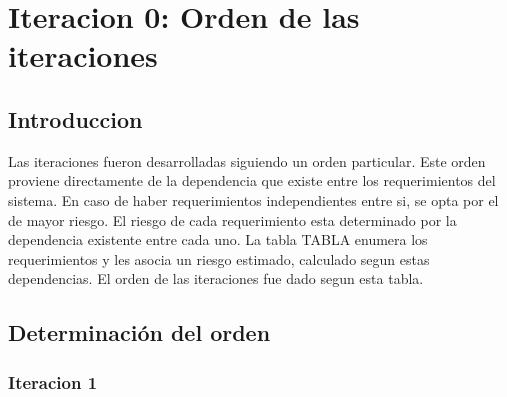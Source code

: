 \chapter{Iteracion 0: Orden de las iteraciones} %
\label{cha:iteracion_0}

\section{Introduccion} %
\label{it0:sec:introduccion}

Las iteraciones fueron desarrolladas siguiendo un orden particular. Este orden proviene directamente de la dependencia que existe entre los requerimientos del sistema. En caso de haber requerimientos independientes entre si, se opta por el de mayor riesgo. El riesgo de cada requerimiento esta determinado por la dependencia existente entre cada uno. La tabla TABLA enumera los requerimientos y les asocia un riesgo estimado, calculado segun estas dependencias. El orden de las iteraciones fue dado segun esta tabla.



\section{Determinación del orden} %
\label{it0:sec:determinacion_del_orden}

\subsection{Iteracion 1} %
\label{sub:iteracion_1}

